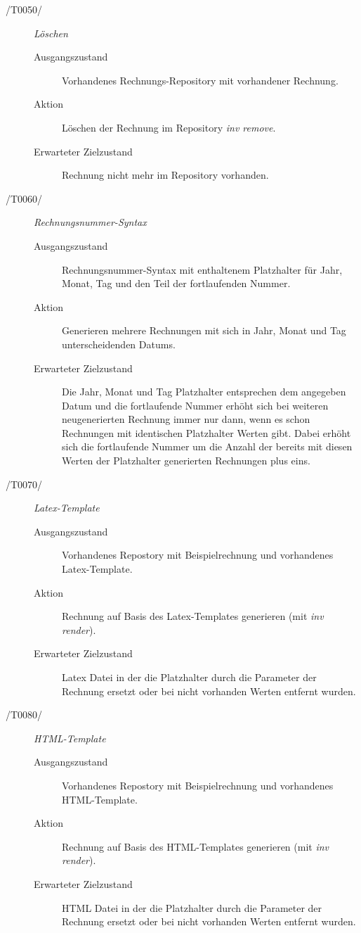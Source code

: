 \begin{description}
  \item[/T0050/]
	\textit{Löschen}
	\begin{description}
		\item[Ausgangszustand]
		Vorhandenes Rechnungs-Repository mit vorhandener Rechnung.
		\item[Aktion]
		Löschen der Rechnung im Repository \textit{inv remove}.
		\item[Erwarteter Zielzustand]
		Rechnung nicht mehr im Repository vorhanden.
	\end{description}

  \item[/T0060/]
	\textit{Rechnungsnummer-Syntax}
	\begin{description}
		\item[Ausgangszustand]
		Rechnungsnummer-Syntax mit enthaltenem Platzhalter für Jahr, Monat, Tag und den Teil der fortlaufenden Nummer.
		\item[Aktion]
		Generieren mehrere Rechnungen mit sich in Jahr, Monat und Tag unterscheidenden Datums.
		\item[Erwarteter Zielzustand]
		Die Jahr, Monat und Tag Platzhalter entsprechen dem angegeben Datum und die fortlaufende Nummer erhöht sich bei weiteren neugenerierten Rechnung immer nur dann, wenn es schon Rechnungen mit identischen Platzhalter Werten gibt. Dabei erhöht sich die fortlaufende Nummer um die Anzahl der bereits mit diesen Werten der Platzhalter generierten Rechnungen plus eins.
	\end{description}

  \item[/T0070/]
	\textit{Latex-Template}
	\begin{description}
		\item[Ausgangszustand]
		Vorhandenes Repostory mit Beispielrechnung und vorhandenes Latex-Template.
		\item[Aktion]
		Rechnung auf Basis des Latex-Templates generieren (mit \textit{inv render}).
		\item[Erwarteter Zielzustand]
		Latex Datei in der die Platzhalter durch die Parameter der Rechnung ersetzt oder bei nicht vorhanden Werten entfernt wurden.
	\end{description}

  \item[/T0080/]
	\textit{HTML-Template}
	\begin{description}
		\item[Ausgangszustand]
		Vorhandenes Repostory mit Beispielrechnung und vorhandenes HTML-Template.
		\item[Aktion]
		Rechnung auf Basis des HTML-Templates generieren (mit \textit{inv render}).
		\item[Erwarteter Zielzustand]
		HTML Datei in der die Platzhalter durch die Parameter der Rechnung ersetzt oder bei nicht vorhanden Werten entfernt wurden.
	\end{description}
\end{description}
